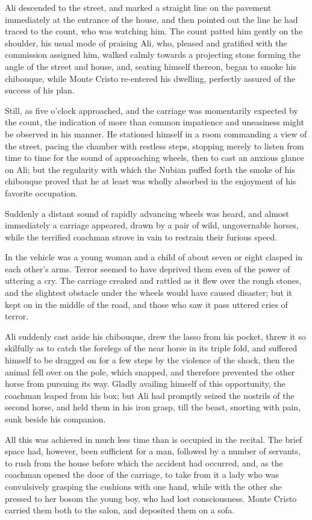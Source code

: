 Ali descended to the street, and marked a straight line on the pavement
immediately at the entrance of the house, and then pointed out the line
he had traced to the count, who was watching him. The count patted him
gently on the shoulder, his usual mode of praising Ali, who, pleased
and gratified with the commission assigned him, walked calmly towards a
projecting stone forming the angle of the street and house, and,
seating himself thereon, began to smoke his chibouque, while Monte
Cristo re-entered his dwelling, perfectly assured of the success of his
plan.

Still, as five o’clock approached, and the carriage was momentarily
expected by the count, the indication of more than common impatience
and uneasiness might be observed in his manner. He stationed himself in
a room commanding a view of the street, pacing the chamber with
restless steps, stopping merely to listen from time to time for the
sound of approaching wheels, then to cast an anxious glance on Ali; but
the regularity with which the Nubian puffed forth the smoke of his
chibouque proved that he at least was wholly absorbed in the enjoyment
of his favorite occupation.

Suddenly a distant sound of rapidly advancing wheels was heard, and
almost immediately a carriage appeared, drawn by a pair of wild,
ungovernable horses, while the terrified coachman strove in vain to
restrain their furious speed.

In the vehicle was a young woman and a child of about seven or eight
clasped in each other’s arms. Terror seemed to have deprived them even
of the power of uttering a cry. The carriage creaked and rattled as it
flew over the rough stones, and the slightest obstacle under the wheels
would have caused disaster; but it kept on in the middle of the road,
and those who saw it pass uttered cries of terror.

Ali suddenly cast aside his chibouque, drew the lasso from his pocket,
threw it so skilfully as to catch the forelegs of the near horse in its
triple fold, and suffered himself to be dragged on for a few steps by
the violence of the shock, then the animal fell over on the pole, which
snapped, and therefore prevented the other horse from pursuing its way.
Gladly availing himself of this opportunity, the coachman leaped from
his box; but Ali had promptly seized the nostrils of the second horse,
and held them in his iron grasp, till the beast, snorting with pain,
sunk beside his companion.

All this was achieved in much less time than is occupied in the
recital. The brief space had, however, been sufficient for a man,
followed by a number of servants, to rush from the house before which
the accident had occurred, and, as the coachman opened the door of the
carriage, to take from it a lady who was convulsively grasping the
cushions with one hand, while with the other she pressed to her bosom
the young boy, who had lost consciousness. Monte Cristo carried them
both to the salon, and deposited them on a sofa.

